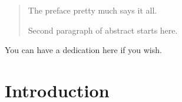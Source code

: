 \documentclass[12pt,twoside]{reedthesis}
\begin{document}
  \listoftables

  \listoffigures
  \begin{abstract}
    The preface pretty much says it all.

    \par

    Second paragraph of abstract starts here.
  \end{abstract}
  \begin{dedication}
    You can have a dedication here if you wish.
  \end{dedication}
\mainmatter %
\pagestyle{fancyplain} %

\hypertarget{introduction}{%
\chapter*{Introduction}\label{introduction}}
\end{document}
